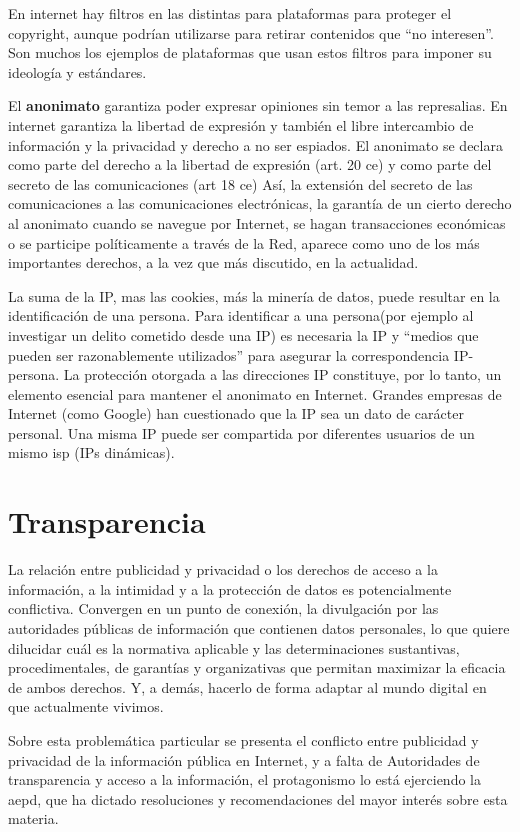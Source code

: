 En internet hay filtros en las distintas para plataformas para proteger el copyright, aunque podrían utilizarse para retirar contenidos que ``no interesen''. Son muchos los ejemplos de plataformas que usan estos filtros para imponer su ideología y estándares.

El \textbf{anonimato} garantiza poder expresar opiniones sin temor a las represalias. En internet garantiza la libertad de expresión y también el libre intercambio de información y la privacidad y derecho a no ser espiados. El anonimato se declara como parte del derecho a la libertad de expresión (art. 20 \gls{ce}) y como parte del secreto de las comunicaciones (art 18 \gls{ce})
Así, la extensión del secreto de las comunicaciones a las comunicaciones electrónicas, la garantía de un cierto derecho al anonimato cuando se navegue por Internet, se hagan transacciones económicas o se participe políticamente a través de la Red, aparece como uno de los más importantes derechos, a la vez que más discutido, en la actualidad.

La suma de la IP, mas las cookies, más la minería de datos, puede resultar en la identificación de una persona. Para identificar a una persona(por ejemplo al investigar un delito cometido desde una IP) es necesaria la IP y ``medios que pueden ser razonablemente utilizados'' para asegurar la correspondencia IP-persona.
La protección otorgada a las direcciones IP constituye, por lo tanto, un elemento esencial para mantener el anonimato en Internet. Grandes empresas de Internet (como Google) han cuestionado que la IP sea un dato de carácter personal. Una misma IP puede ser compartida por diferentes usuarios de un mismo \gls{isp} (IPs dinámicas).

\section{Transparencia}

La relación entre publicidad y privacidad o los derechos de acceso a la información, a la intimidad y a la protección de datos es potencialmente conflictiva.
Convergen en un punto de conexión, la divulgación por las autoridades públicas de información que contienen datos personales, lo que quiere dilucidar cuál es la normativa aplicable y las determinaciones sustantivas, procedimentales, de garantías y organizativas que permitan maximizar la eficacia de ambos derechos. Y, a demás, hacerlo de forma adaptar al mundo digital en que actualmente vivimos.

Sobre esta problemática particular se presenta el conflicto entre publicidad y privacidad de la información pública en Internet, y a falta de Autoridades de transparencia y acceso a la información, el protagonismo lo está ejerciendo la \gls{aepd}, que ha dictado resoluciones y recomendaciones del mayor interés sobre esta materia.

